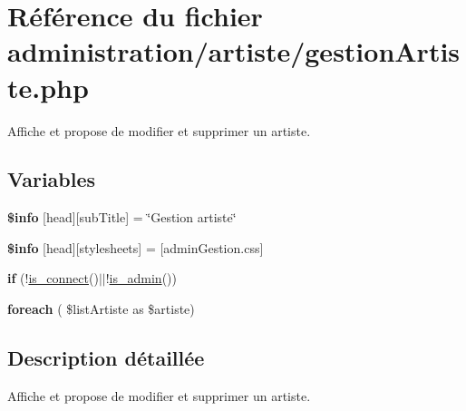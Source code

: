 \hypertarget{gestionArtiste_8php}{}\section{Référence du fichier administration/artiste/gestion\+Artiste.php}
\label{gestionArtiste_8php}


Affiche et propose de modifier et supprimer un artiste.  


\subsection*{Variables}
\begin{DoxyCompactItemize}
\item 
\mbox{\label{gestionArtiste_8php_a024f87f9bf4f3b33710e2e7ff8f60823}} 
{\bfseries \$info} \mbox{[}\textquotesingle{}head\textquotesingle{}\mbox{]}\mbox{[}\textquotesingle{}sub\+Title\textquotesingle{}\mbox{]} = \char`\"{}Gestion artiste\char`\"{}
\item 
\mbox{\label{gestionArtiste_8php_af6044c8bf78ebc8c58057e14d7738bbd}} 
{\bfseries \$info} \mbox{[}\textquotesingle{}head\textquotesingle{}\mbox{]}\mbox{[}\textquotesingle{}stylesheets\textquotesingle{}\mbox{]} = \mbox{[}\textquotesingle{}admin\+Gestion.\+css\textquotesingle{}\mbox{]}
\item 
\mbox{\label{gestionArtiste_8php_af06578d46576ae68ff2e0780832fd8a0}} 
{\bfseries if} (!\hyperlink{fonctionCompte_8php_a2fe594e0482307b8729ea37780d6f74b}{is\+\_\+connect}()$\vert$$\vert$!\hyperlink{fonctionCompte_8php_a0b327581800dba50ad70720e23ae2ed2}{is\+\_\+admin}())
\item 
\mbox{\label{gestionArtiste_8php_a3a7aa934a8d9aeae8241ea0ac143bc44}} 
{\bfseries foreach} ( \$list\+Artiste as \$artiste)
\end{DoxyCompactItemize}


\subsection{Description détaillée}
Affiche et propose de modifier et supprimer un artiste. 

